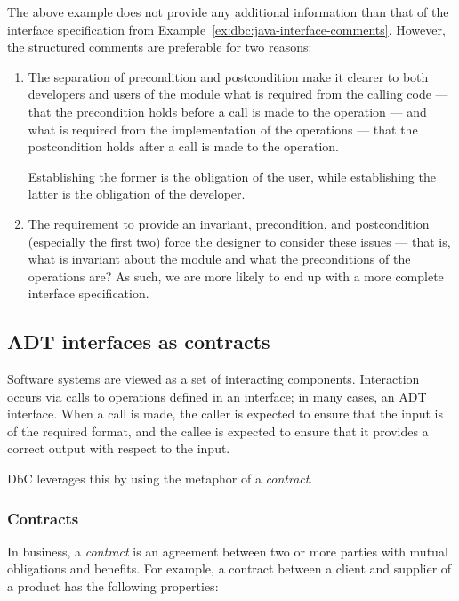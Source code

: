 The above example does not provide any additional information than that of the interface specification from Example~\ref{ex:dbc:java-interface-comments}. However, the structured comments are preferable for two reasons:

\begin{enumerate}

 \item The separation of precondition and postcondition make it clearer to both developers and users of the module what is required from the calling code --- that the precondition holds before a call is made to the operation --- and what is required from the implementation of the operations --- that the postcondition holds after a call is made to the operation. 

 Establishing the former is the obligation of the user, while establishing the latter is the obligation of the developer.

 \item The requirement to provide an invariant, precondition, and postcondition (especially the first two) force the designer to consider these issues --- that is, what is invariant about the module and what the preconditions of the operations are? As such, we are more likely to end up with a more complete interface specification.

\end{enumerate}


\subsection{ADT interfaces as contracts}

Software systems are viewed as a set of interacting components. Interaction occurs via calls to operations defined in an interface; in many cases, an ADT interface. When a call is made, the caller is expected to ensure that the input is of the required format, and the callee is expected to ensure that it provides a correct output with respect to the input.

DbC leverages this by using the metaphor of a \emph{contract}.

\subsubsection*{Contracts}

In business, a {\em contract} is an agreement between two or more parties with mutual obligations and benefits. For example, a contract between a client and supplier of a product has the following properties:

